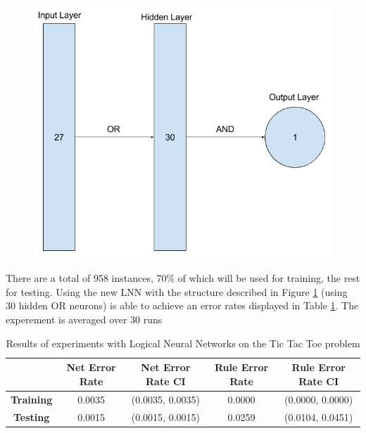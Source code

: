 \begin{figure}[H]
	\centering
	\begin{minipage}[b]{0.5\textwidth}
		\includegraphics[width=\textwidth]{Tic-Tac-Toe-Net.png}
		\caption{}
		\label{fig:tic-tac-toe-net}
	\end{minipage}
	\hfill
\end{figure}

There are a total of 958 instances, 70\% of which will be used for training, the rest for testing. Using the new LNN with the structure described in Figure \ref{fig:tic-tac-toe-net} (using 30 hidden OR neurons) is able to achieve an error rates displayed in Table \ref{tab:tic-tac-toe-lnn-peformance-results}. The experement is averaged over 30 runs

\begin{table}[H]
	\begin{center}
		\begin{tabular}{| c | c | c | c | c |}
			\hline
			\textbf{} & \textbf{Net Error Rate} & \textbf{Net Error Rate CI} & \textbf{Rule Error Rate} & \textbf{Rule Error Rate CI}\\
			\hline
			\hline
			\textbf{Training} & 0.0035 & (0.0035, 0.0035) & 0.0000 & (0.0000, 0.0000)\\
			\textbf{Testing} & 0.0015 & (0.0015, 0.0015) & 0.0259 & (0.0104, 0.0451)\\
			\hline
		\end{tabular}
	\end{center}
	\caption{Results of experiments with Logical Neural Networks on the Tic Tac Toe problem}
	\label{tab:tic-tac-toe-lnn-peformance-results}
\end{table}

